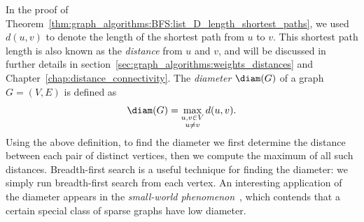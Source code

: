 In the proof of
Theorem~\ref{thm:graph_algorithms:BFS:list_D_length_shortest_paths},
we used $d(u,v)$ to denote the length of the shortest path from $u$ to
$v$. This shortest path length is also known as the
\emph{distance} from $u$ and $v$, and will be
discussed in further details in
section~\ref{sec:graph_algorithms:weights_distances} and
Chapter~\ref{chap:distance_connectivity}. The
\emph{diameter} $\diam(G)$ of a graph $G = (V,E)$ is
defined as
\[
\diam(G)
=
\max_{\substack{u,v \in V \\ u \neq v}} d(u,v).
\]
Using the above definition, to find the diameter we
first determine the distance between each pair of
distinct vertices, then we compute the maximum of all such
distances. Breadth-first search is a
useful technique for finding the diameter: we simply
run breadth-first search from each
vertex. An interesting application of the diameter
appears in the
\emph{small-world phenomenon}~\cite{Kleinberg2000,
  Milgram1967,WattsStrogatz1998}, which contends that a certain
special class of sparse graphs have low diameter.




